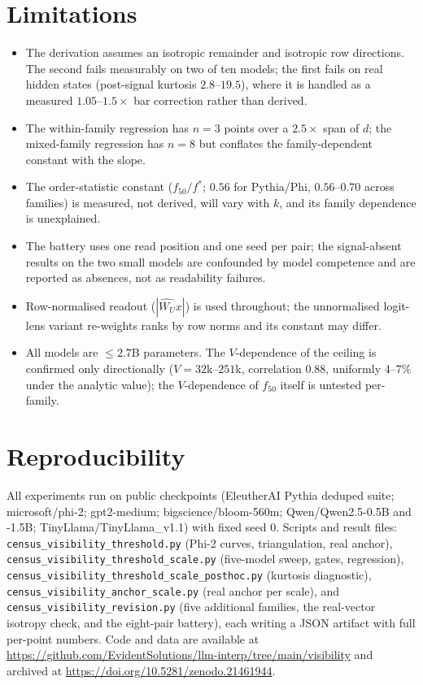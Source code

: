 \documentclass[11pt]{article}
\newcommand{\WU}{W_U}
\newcommand{\fstar}{f^{*}}
\begin{document}
\section{Limitations}

\begin{itemize}
\item The derivation assumes an isotropic remainder and isotropic
  row directions. The second fails measurably on two of ten models;
  the first fails on real hidden states (post-signal kurtosis
  $2.8$--$19.5$), where it is handled as a measured $1.05$--$1.5
  \times$ bar correction rather than derived.
\item The within-family regression has $n{=}3$ points over a
  $2.5\times$ span of $d$; the mixed-family regression has $n{=}8$
  but conflates the family-dependent constant with the slope.
\item The order-statistic constant ($f_{50}/\fstar$; $0.56$ for
  Pythia/Phi, $0.56$--$0.70$ across families) is measured, not
  derived, will vary with $k$, and its family dependence is
  unexplained.
\item The battery uses one read position and one seed per pair; the
  signal-absent results on the two small models are confounded by
  model competence and are reported as absences, not as readability
  failures.
\item Row-normalised readout ($|\hat{\WU}x|$) is used throughout;
  the unnormalised logit-lens variant re-weights ranks by row norms
  and its constant may differ.
\item All models are $\leq 2.7$B parameters. The $V$-dependence of
  the ceiling is confirmed only directionally ($V = 32$k--$251$k,
  correlation $0.88$, uniformly $4$--$7\%$ under the analytic
  value); the $V$-dependence of $f_{50}$ itself is untested
  per-family.
\end{itemize}

\section{Reproducibility}
\label{sec:repro}

{\raggedright
All experiments run on public checkpoints (EleutherAI Pythia deduped
suite; microsoft/phi-2; gpt2-medium; bigscience/bloom-560m;
Qwen/Qwen2.5-0.5B and -1.5B; TinyLlama/TinyLlama\_v1.1) with fixed
seed 0. Scripts and result files:
\texttt{census\_visibility\_threshold.py} (Phi-2 curves,
triangulation, real anchor),
\texttt{census\_visibility\_threshold\_scale.py} (five-model sweep,
gates, regression),
\texttt{census\_visibility\_threshold\_scale\_posthoc.py} (kurtosis
diagnostic),
\texttt{census\_visibility\_anchor\_scale.py} (real anchor per
scale), and
\texttt{census\_visibility\_revision.py} (five additional families,
the real-vector isotropy check, and the eight-pair battery), each
writing a JSON artifact with full per-point numbers. Code and data are
available at
\url{https://github.com/EvidentSolutions/llm-interp/tree/main/visibility}
and archived at \url{https://doi.org/10.5281/zenodo.21461944}.\par}
\end{document}
